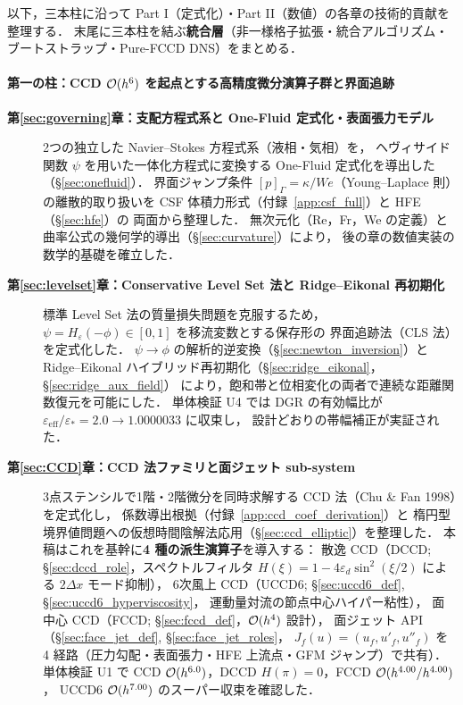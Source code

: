 以下，三本柱に沿って Part I（定式化）・Part II（数値）の各章の技術的貢献を整理する．
末尾に三本柱を結ぶ\textbf{統合層}（非一様格子拡張・統合アルゴリズム・ブートストラップ・Pure-FCCD DNS）をまとめる．

\paragraph{第一の柱：CCD $\mathcal{O}(h^6)$ を起点とする高精度微分演算子群と界面追跡}\hfill\null

\begin{description}
  \item[\textbf{第\ref{sec:governing}章：支配方程式系と One-Fluid 定式化・表面張力モデル}]
        2つの独立した Navier--Stokes 方程式系（液相・気相）を，
        ヘヴィサイド関数 $\psi$ を用いた一体化方程式に変換する
        One-Fluid 定式化を導出した（§\ref{sec:onefluid}）．
        界面ジャンプ条件 $[p]_\Gamma=\kappa/We$（Young--Laplace 則）の離散的取り扱いを
        CSF 体積力形式（付録~\ref{app:csf_full}）と HFE（§\ref{sec:hfe}）の
        両面から整理した．
        無次元化（Re，Fr，We の定義）と曲率公式の幾何学的導出（§\ref{sec:curvature}）により，
        後の章の数値実装の数学的基礎を確立した．

  \item[\textbf{第\ref{sec:levelset}章：Conservative Level Set 法と Ridge--Eikonal 再初期化}]
        標準 Level Set 法の質量損失問題を克服するため，
        $\psi = H_\varepsilon(-\phi) \in [0,1]$ を移流変数とする保存形の
        界面追跡法（CLS 法）を定式化した．
        $\psi \to \phi$ の解析的逆変換（§\ref{sec:newton_inversion}）と
        Ridge--Eikonal ハイブリッド再初期化（§\ref{sec:ridge_eikonal}，§\ref{sec:ridge_aux_field}）
        により，飽和帯と位相変化の両者で連続な距離関数復元を可能にした．
        単体検証 U4 では DGR の有効幅比が
        $\varepsilon_{\mathrm{eff}}/\varepsilon_*=2.0\to1.0000033$ に収束し，
        設計どおりの帯幅補正が実証された．

  \item[\textbf{第\ref{sec:CCD}章：CCD 法ファミリと面ジェット sub-system}]
        3点ステンシルで1階・2階微分を同時求解する CCD 法（Chu \& Fan 1998）を定式化し，
        係数導出根拠（付録~\ref{app:ccd_coef_derivation}）と
        楕円型境界値問題への仮想時間陰解法応用（§\ref{sec:ccd_elliptic}）を整理した．
        本稿はこれを基幹に\textbf{4 種の派生演算子}を導入する：
        散逸 CCD（DCCD; §\ref{sec:dccd_role}，スペクトルフィルタ
        $H(\xi)=1-4\varepsilon_d\sin^2(\xi/2)$ による $2\Delta x$ モード抑制），
        6次風上 CCD（UCCD6; §\ref{sec:uccd6_def}, §\ref{sec:uccd6_hyperviscosity}，
        運動量対流の節点中心ハイパー粘性），
        面中心 CCD（FCCD; §\ref{sec:fccd_def}，$\mathcal{O}(h^4)$ 設計），
        面ジェット API（§\ref{sec:face_jet_def}, §\ref{sec:face_jet_roles}，
        $J_f(u)=(u_f,u'_f,u''_f)$ を 4 経路（圧力勾配・表面張力・HFE 上流点・GFM ジャンプ）で共有）．
        単体検証 U1 で CCD $\mathcal{O}(h^{6.0})$，DCCD $H(\pi)=0$，FCCD $\mathcal{O}(h^{4.00}/h^{4.00})$，
        UCCD6 $\mathcal{O}(h^{7.00})$ のスーパー収束を確認した．


\end{description}
